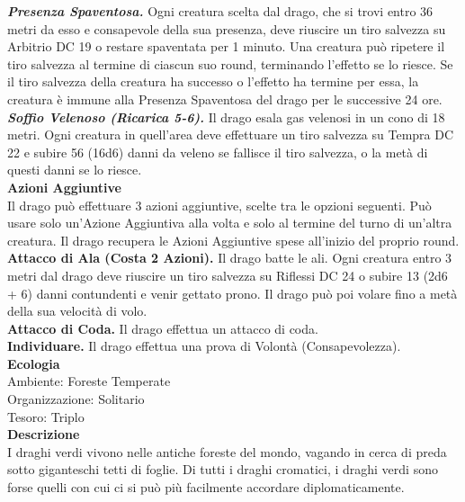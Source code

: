 \begin{multicols}{2}
\emph{\textbf{Presenza Spaventosa.}} Ogni creatura scelta dal drago, che si trovi entro 36 metri da esso e consapevole della sua presenza, deve riuscire un tiro salvezza su Arbitrio DC  19 o restare spaventata per 1 minuto. Una creatura può ripetere il tiro salvezza al termine di ciascun suo round, terminando l'effetto se lo riesce. Se il tiro salvezza della creatura ha successo o l'effetto ha termine per essa, la creatura è immune alla Presenza Spaventosa del drago per le successive 24 ore.\\
\emph{\textbf{Soffio Velenoso (Ricarica 5-6).}} Il drago esala gas velenosi in un cono di 18 metri. Ogni creatura in quell'area deve effettuare un tiro salvezza su Tempra DC  22 e subire 56 (16d6) danni da veleno se fallisce il tiro salvezza, o la metà di questi danni se lo riesce.\\
\textbf{Azioni Aggiuntive}\\
Il drago può effettuare 3 azioni aggiuntive, scelte tra le opzioni seguenti. Può usare solo un'Azione Aggiuntiva alla volta e solo al termine del turno di un'altra creatura. Il drago recupera le Azioni Aggiuntive spese all'inizio del proprio round.
\textbf{Attacco di Ala (Costa 2 Azioni).} Il drago batte le ali. Ogni creatura entro 3 metri dal drago deve riuscire un tiro salvezza su Riflessi DC  24 o subire 13 (2d6 + 6) danni contundenti e venir gettato prono. Il drago può poi volare fino a metà della sua velocità di volo.\\
\textbf{Attacco di Coda.} Il drago effettua un attacco di coda.\\
\textbf{Individuare.} Il drago effettua una prova di Volontà (Consapevolezza).\\
\textbf{Ecologia}\\
Ambiente: Foreste Temperate\\
Organizzazione: Solitario\\
Tesoro: Triplo\\
\textbf{Descrizione}\\
I draghi verdi vivono nelle antiche foreste del mondo, vagando in cerca di preda sotto giganteschi tetti di foglie. Di tutti i draghi cromatici, i draghi verdi sono forse quelli con cui ci si può più facilmente accordare diplomaticamente.\\


\end{multicols}
